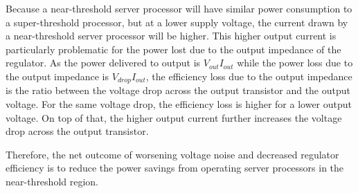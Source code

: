 Because a near-threshold server processor will have similar power consumption to a super-threshold processor, but at a lower supply voltage, the current drawn by a near-threshold server processor will be higher.
This higher output current is particularly problematic for the power lost due to the output impedance of the regulator.
As the power delivered to output is $V_{out}I_{out}$ while the power loss due to the output impedance is $V_{drop}I_{out}$, the efficiency loss due to the output impedance is the ratio between the voltage drop across the output transistor and the output voltage.
For the same voltage drop, the efficiency loss is higher for a lower output voltage.
On top of that, the higher output current further increases the voltage drop across the output transistor.

Therefore, the net outcome of worsening voltage noise and decreased regulator efficiency is to reduce the power savings from operating server processors in the near-threshold region.

